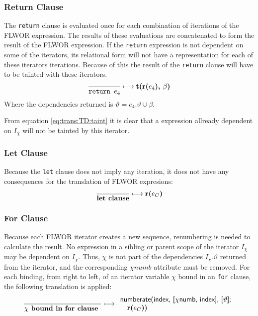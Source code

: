 \subsubsection{Return Clause}
The \texttt{return} clause is evaluated once for each combination of iterations of the FLWOR expression. The
results of these evaluations are concatenated to form the result of the FLWOR expression. If the \texttt{return}
expression is not dependent on some of the iterators, its relational form will not have a representation for each
of these iterators iterations. Because of this the result of the \texttt{return} clause will have to be tainted
with these iterators.
\begin{equation}
\frac{}{\mbox{\texttt{return }}e_{4}}\longmapsto
\mbox{\textbf{t(r(}}e_{4}\mbox{\textbf{), }}\beta\mbox{\textbf{)}}
\label{rule:trans:TD:returnTaint}
\end{equation}
Where the dependencies returned is $\vartheta = e_4.\vartheta \cup \beta$.

From equation \ref{eq:trans:TD:taint} it is clear that a expression allready dependent on $I_{\chi}$ will not be
tainted by this iterator.

\subsubsection{Let Clause}
Because the \texttt{let} clause does not imply any iteration, it does not have any consequences for the
translation of FLWOR expresions:
\begin{equation}
\frac{}{\mbox{\textbf{let clause}}}\longmapsto \mbox{\textbf{r(}}e_{C}\mbox{\textbf{)}}
\label{rule:trans:TD:letclause}
\end{equation}

\subsubsection{For Clause}
Because each FLWOR iterator creates a new sequence, renumbering is needed to calculate the result. No expression in
a sibling or parent scope of the iterator $I_{\chi}$ may be dependent on $I_{\chi}$. Thus, $\chi$ is not part of the
dependencies $I_{\chi}.\vartheta$ returned from the iterator, and the corresponding $\chi{numb}$ attribute must be
removed. For each binding, from right to left, of an iterator variable $\chi$ bound in an \texttt{for} clause,
the following translation is applied: 
\begin{equation}
\frac{}{\chi\mbox{\textbf{ bound in for clause }}}
\longmapsto
\begin{array}{l}
\mbox{\textsf{numberate(index, [}}\chi\mbox{\textsf{numb, index], [}}\vartheta\mbox{\textsf{];}} \\ \quad
\mbox{\textbf{r(}}e_{C}\mbox{\textbf{)}\textsf{)}}
\end{array}
\label{rule:trans:TD:forReturn}
\end{equation}

